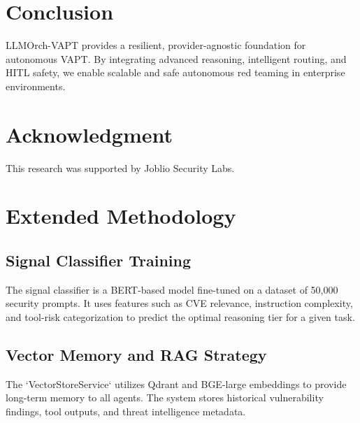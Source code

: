 \documentclass[conference,compsoc]{IEEEtran}
\begin{document}
\section{Conclusion}
LLMOrch-VAPT provides a resilient, provider-agnostic foundation for autonomous VAPT. By integrating advanced reasoning, intelligent routing, and HITL safety, we enable scalable and safe autonomous red teaming in enterprise environments.

\section*{Acknowledgment}
This research was supported by Joblio Security Labs.




\appendix
\section{Extended Methodology}
\subsection{Signal Classifier Training}
The signal classifier is a BERT-based model fine-tuned on a dataset of 50,000 security prompts. It uses features such as CVE relevance, instruction complexity, and tool-risk categorization to predict the optimal reasoning tier for a given task.

\subsection{Vector Memory and RAG Strategy}
The `VectorStoreService` utilizes Qdrant and BGE-large embeddings to provide long-term memory to all agents. The system stores historical vulnerability findings, tool outputs, and threat intelligence metadata.
\end{document}
